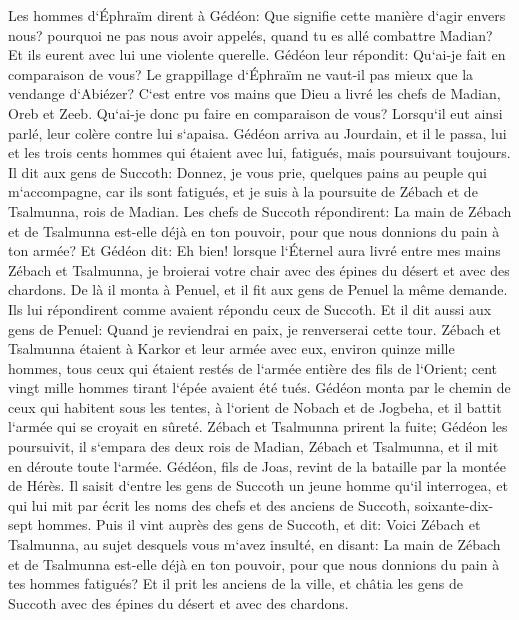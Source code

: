 \verse Les hommes d`Éphraïm dirent à Gédéon: Que signifie cette manière d`agir envers nous? pourquoi ne pas nous avoir appelés, quand tu es allé combattre Madian? Et ils eurent avec lui une violente querelle. 
\verse Gédéon leur répondit: Qu`ai-je fait en comparaison de vous? Le grappillage d`Éphraïm ne vaut-il pas mieux que la vendange d`Abiézer? 
\verse C`est entre vos mains que Dieu a livré les chefs de Madian, Oreb et Zeeb. Qu`ai-je donc pu faire en comparaison de vous? Lorsqu`il eut ainsi parlé, leur colère contre lui s`apaisa. 
\verse Gédéon arriva au Jourdain, et il le passa, lui et les trois cents hommes qui étaient avec lui, fatigués, mais poursuivant toujours. 
\verse Il dit aux gens de Succoth: Donnez, je vous prie, quelques pains au peuple qui m`accompagne, car ils sont fatigués, et je suis à la poursuite de Zébach et de Tsalmunna, rois de Madian. 
\verse Les chefs de Succoth répondirent: La main de Zébach et de Tsalmunna est-elle déjà en ton pouvoir, pour que nous donnions du pain à ton armée? 
\verse Et Gédéon dit: Eh bien! lorsque l`Éternel aura livré entre mes mains Zébach et Tsalmunna, je broierai votre chair avec des épines du désert et avec des chardons. 
\verse De là il monta à Penuel, et il fit aux gens de Penuel la même demande. Ils lui répondirent comme avaient répondu ceux de Succoth. 
\verse Et il dit aussi aux gens de Penuel: Quand je reviendrai en paix, je renverserai cette tour. 
\verse Zébach et Tsalmunna étaient à Karkor et leur armée avec eux, environ quinze mille hommes, tous ceux qui étaient restés de l`armée entière des fils de l`Orient; cent vingt mille hommes tirant l`épée avaient été tués. 
\verse Gédéon monta par le chemin de ceux qui habitent sous les tentes, à l`orient de Nobach et de Jogbeha, et il battit l`armée qui se croyait en sûreté. 
\verse Zébach et Tsalmunna prirent la fuite; Gédéon les poursuivit, il s`empara des deux rois de Madian, Zébach et Tsalmunna, et il mit en déroute toute l`armée. 
\verse Gédéon, fils de Joas, revint de la bataille par la montée de Hérès. 
\verse Il saisit d`entre les gens de Succoth un jeune homme qu`il interrogea, et qui lui mit par écrit les noms des chefs et des anciens de Succoth, soixante-dix-sept hommes. 
\verse Puis il vint auprès des gens de Succoth, et dit: Voici Zébach et Tsalmunna, au sujet desquels vous m`avez insulté, en disant: La main de Zébach et de Tsalmunna est-elle déjà en ton pouvoir, pour que nous donnions du pain à tes hommes fatigués? 
\verse Et il prit les anciens de la ville, et châtia les gens de Succoth avec des épines du désert et avec des chardons. 
